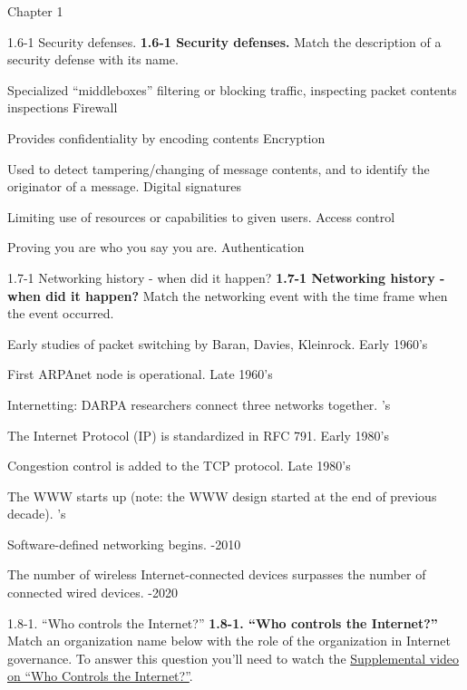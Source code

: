 \documentclass[a4paper]{article}
\begin{document}
\begin{quiz}{Chapter 1}
\begin{matching}[points=1,shuffle=true]{1.6-1 Security defenses.}
\textbf{1.6-1 Security defenses.}
Match the description of a security defense with its name.
\item Specialized ``middleboxes'' filtering or blocking traffic, inspecting packet contents inspections \answer Firewall
\item Provides confidentiality by encoding contents \answer Encryption
\item Used to detect tampering/changing of message contents, and to identify the originator of a message. \answer Digital signatures
\item Limiting use of resources or capabilities to given users. \answer Access control
\item Proving you are who you say you are. \answer Authentication
\end{matching}

\begin{matching}[points=1]{1.7-1 Networking history - when did it happen?}
\textbf{1.7-1 Networking history - when did it happen?}
Match the networking event with the time frame when the event occurred.
\item Early studies of packet switching by Baran, Davies, Kleinrock. \answer Early 1960's
\item First ARPAnet node is operational. \answer Late 1960's
\item Internetting: DARPA researchers connect three networks together. 's
\item The Internet Protocol (IP) is standardized in RFC 791. \answer Early 1980's
\item Congestion control is added to the TCP protocol. \answer Late 1980's
\item The WWW starts up (note: the WWW design started at the end of previous decade). 's
\item Software-defined networking begins. -2010
\item The number of wireless Internet-connected devices surpasses the number of connected wired devices. -2020
\end{matching}

\begin{matching}[points=1,shuffle=true]{1.8-1. ``Who controls the Internet?''}
\textbf{1.8-1. ``Who controls the Internet?''}
Match an organization name below with the role of the organization in Internet governance. 
To answer this question you'll need to watch the \href{https://www.youtube.com/watch?v=xrd4hD_9fS8}{Supplemental video on ``Who Controls the Internet?''}.


\end{matching}
\end{quiz}
\end{document}
